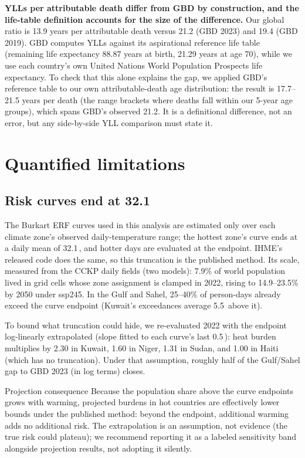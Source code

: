 \documentclass[11pt]{ozreport}
\begin{document}
\textbf{YLLs per attributable death differ from GBD by construction, and
the life-table definition accounts for the size of the difference.} Our
global ratio is 13.9 years per attributable death versus 21.2 (GBD 2023)
and 19.4 (GBD 2019). GBD computes YLLs against its aspirational reference
life table (remaining life expectancy 88.87 years at birth, 21.29 years at
age 70), while we use each country's own United Nations World Population
Prospects life expectancy. To check that this alone explains the gap, we
applied GBD's reference table to our own attributable-death age
distribution: the result is 17.7--21.5 years per death (the range brackets
where deaths fall within our 5-year age groups), which spans GBD's
observed 21.2. It is a definitional difference, not an error, but any
side-by-side YLL comparison must state it.

\section{Quantified limitations}\label{sec:limits}

\subsection{Risk curves end at 32.1\,\textcelsius{}}

The Burkart ERF curves used in this analysis are estimated only over each
climate zone's observed daily-temperature range; the hottest zone's curve
ends at a daily mean of 32.1\,\textcelsius, and hotter days are evaluated
at the endpoint. IHME's released code does the same, so this truncation is
the published method. Its scale, measured from the CCKP daily fields
(two models): 7.9\% of world population lived in grid cells whose zone
assignment is clamped in 2022, rising to 14.9--23.5\% by 2050 under ssp245.
In the Gulf and Sahel, 25--40\% of person-days already exceed the curve
endpoint (Kuwait's exceedances average 5.5\,\textcelsius{} above it).

To bound what truncation could hide, we re-evaluated 2022 with the endpoint
log-linearly extrapolated (slope fitted to each curve's last
0.5\,\textcelsius): heat burden multiplies by 2.30 in Kuwait, 1.60 in
Niger, 1.31 in Sudan, and 1.00 in Haiti (which has no truncation). Under
that assumption, roughly half of the Gulf/Sahel gap to GBD
2023 (in log terms) closes.

\begin{ozcaveat}{Projection consequence}
Because the population share above the curve endpoints grows with warming,
projected burdens in hot countries are effectively lower bounds under the
published method: beyond the endpoint, additional warming adds no
additional risk. The extrapolation is an assumption, not evidence
(the true risk could plateau); we recommend reporting it as a labeled
sensitivity band alongside projection results, not adopting it silently.
\end{ozcaveat}
\end{document}

